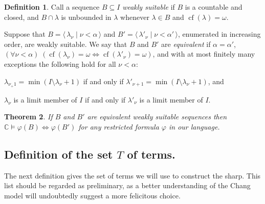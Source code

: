 \documentclass[
twoside,
]{article}
\newenvironment{myinparaenum}{\begin{inparaenum}[\upshape(i)]
}{\end{inparaenum}}
\newtheorem{theorem}{Theorem}[section]
\theoremstyle{definition}
\newtheorem{definition}[theorem]{Definition}
\theoremstyle{remark}
\renewcommand{\phi}{\varphi}
\newcommand{\pair}[1]{\langle#1\rangle}
\newcommand{\seq}[1]{\pair{\,#1\,}}
\DeclareMathOperator{\cof}{cf}
\newcommand\chang{\mathbb{C}}
\begin{document}
\begin{definition}
  \label{def:weaklySuitable}
  Call  a sequence $B\subseteq I$ \emph{weakly suitable} if  $B$
  is a countable and closed, and 
  $B\cap\lambda$ is unbounded in $\lambda$ whenever $\lambda\in B$
  and $\cof(\lambda)=\omega$.

  Suppose that $B=\seq{\lambda_\nu\mid \nu<\alpha}$ and
  $B'=\seq{\lambda'_\nu\mid \nu<\alpha'}$, enumerated in increasing
  order,  are weakly suitable.    We say that $B$ and $B'$ are 
  \emph{equivalent} if $\alpha=\alpha'$,
  $(\forall\nu<\alpha)\;(\cof(\lambda_\nu)=\omega\iff\cof(\lambda'_\nu)=\omega)$,
  and with at most finitely many exceptions the following hold for all $\nu<\alpha$:
  \begin{myinparaenum}
  \item $\lambda_{\nu_+1}=\min(I\setminus\lambda_\nu+1)$ if and only
    if $\lambda'_{\nu+1}=\min(I\setminus\lambda_{\nu}+1)$, and
  \item $\lambda_\nu$ is a limit member of $I$ if and only if
    $\lambda'_\nu$ is a limit member of $I$.
  \end{myinparaenum}
\end{definition}
\begin{theorem}\label{thm:modified-suitable}
  If $B$ and $B'$ are equivalent weakly suitable sequences then
  $\chang\models\phi(B)\iff\phi(B')$ for any restricted formula $\phi$
  in our language.
\end{theorem}






\subsection{Definition of the set $T$ of terms.}
The next definition gives the set of terms we will use to construct the sharp.
This list should be regarded as preliminary, as a better understanding
of the Chang model will undoubtedly suggest a more felicitous choice. 
\end{document}
